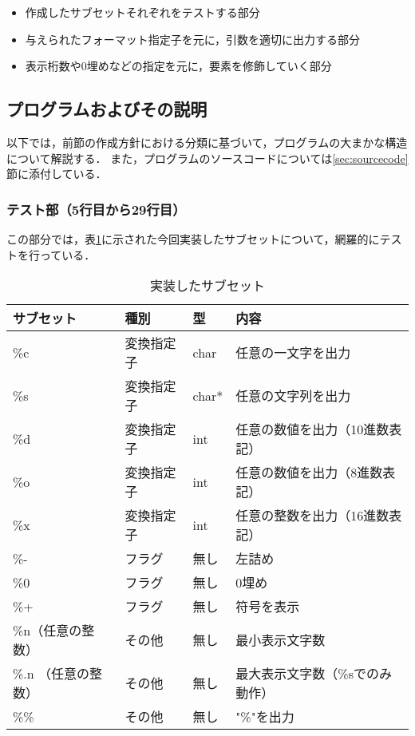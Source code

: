 \documentclass[a4j,11pt]{jarticle}
\begin{document}
\begin{itemize}
      \item 作成したサブセットそれぞれをテストする部分
      \item 与えられたフォーマット指定子を元に，引数を適切に出力する部分
      \item 表示桁数や0埋めなどの指定を元に，要素を修飾していく部分
\end{itemize}

\subsection{プログラムおよびその説明}

以下では，前節の作成方針における分類に基づいて，プログラムの大まかな構造について解説する．
また，プログラムのソースコードについては\ref{sec:sourcecode}節に添付している．

\subsubsection{テスト部（5行目から29行目）}
この部分では，表\ref{tbl:2-5}に示された今回実装したサブセットについて，網羅的にテストを行っている．

\begin{table}[]
      \centering
      \caption{実装したサブセット}
      \label{tbl:2-5}
      \begin{tabular}{|l|l|l|l|}
            \hline
            サブセット & 種別 & 型 & 内容                  \\ \hline
            \%c   & 変換指定子 & char  & 任意の一文字を出力           \\ \hline
            \%s   & 変換指定子 & char* & 任意の文字列を出力           \\ \hline
            \%d   & 変換指定子 & int   & 任意の数値を出力（10進数表記）    \\ \hline
            \%o   & 変換指定子 & int   & 任意の数値を出力（8進数表記）     \\ \hline
            \%x   & 変換指定子 & int   & 任意の整数を出力（16進数表記）    \\ \hline
            \%-  & フラグ & 無し    & 左詰め           \\ \hline
            \%0  & フラグ & 無し    & 0埋め             \\ \hline
            \%+  & フラグ & 無し    & 符号を表示         \\ \hline
            \%n（任意の整数）  & その他 & 無し    & 最小表示文字数   \\ \hline
            \%.n （任意の整数） & その他 & 無し    & 最大表示文字数（\%sでのみ動作）   \\ \hline
            \%\%  & その他 & 無し    & "\%"を出力             \\ \hline
      \end{tabular}
\end{table}
\end{document}
